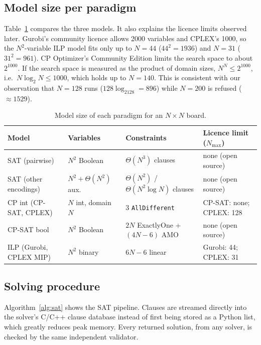 \subsection{Model size per paradigm}
Table~\ref{tab:modelsize} compares the three models. It also explains the licence limits observed later. Gurobi's community licence allows 2000 variables and CPLEX's 1000, so the $N^2$-variable ILP model fits only up to $N=44$ ($44^2=1936$) and $N=31$ ($31^2=961$). CP Optimizer's Community Edition limits the search space to about $2^{1000}$. If the search space is measured as the product of domain sizes, $N^N\le2^{1000}$, i.e.\ $N\log_2N\le1000$, which holds up to $N=140$. This is consistent with our observation that $N=128$ runs ($128\log_2128=896$) while $N=200$ is refused ($\approx1529$).

\begin{table}[pos=htbp]
\caption{Model size of each paradigm for an $N\times N$ board.}\label{tab:modelsize}
\centering\small
\setlength{\tabcolsep}{2.2pt}
\begin{tabular}{llll}
\toprule
Model & Variables & Constraints & Licence limit ($N_{\max}$) \\
\midrule
SAT (pairwise)            & $N^2$ Boolean             & $\Theta(N^3)$ clauses & none (open source) \\
SAT (other encodings)     & $N^2 + \Theta(N^2)$ aux.\ & $\Theta(N^2)$ / $\Theta(N^2\log N)$ clauses & none (open source) \\
CP int (CP-SAT, CPLEX)    & $N$ int, domain $N$       & 3 \texttt{AllDifferent} & CP-SAT: none; CPLEX: 128 \\
CP-SAT bool               & $N^2$ Boolean             & $2N$ ExactlyOne + $(4N-6)$ AMO & none (open source) \\
ILP (Gurobi, CPLEX MIP)   & $N^2$ binary              & $6N-6$ linear & Gurobi: 44; CPLEX: 31 \\
\bottomrule
\end{tabular}
\end{table}

\subsection{Solving procedure}
Algorithm~\ref{alg:sat} shows the SAT pipeline. Clauses are streamed directly into the solver's C/C++ clause database instead of first being stored as a Python list, which greatly reduces peak memory. Every returned solution, from any solver, is checked by the same independent validator.

